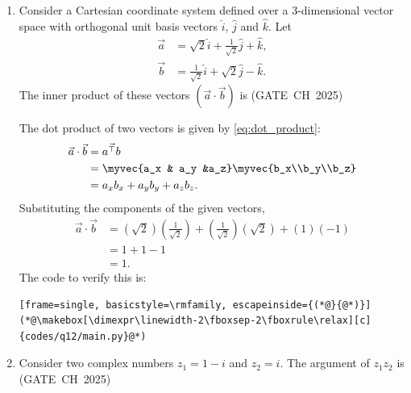 \begin{enumerate}[label=\thesubsection.\arabic*, ref=\thesubsection.\theenumi,itemsep=0pt]

\item Consider a Cartesian coordinate system defined over a 3-dimensional vector space with orthogonal unit basis vectors $\hat{i}$, $\hat{j}$ and $\hat{k}$. Let
\begin{align}
\vec{a} &= \sqrt{2}\hat{i}+\frac{1}{\sqrt{2}}\hat{j}+\hat{k},\\
\vec{b} &= \frac{1}{\sqrt{2}}\hat{i}+\sqrt{2}\hat{j}-\hat{k}.
\end{align}
The inner product of these vectors $(\vec{a}\cdot\vec{b})$ is \hfill (GATE~CH~2025)
\begin{enumerate}[itemsep=0pt]
\end{enumerate}

\solution The dot product of two vectors is given by \eqref{eq:dot_product}:
\begin{align}
\vec{a}\cdot\vec{b} &= \vec{a^{\top}b}\\
&= \myvec{a_x & a_y &a_z}\myvec{b_x\\b_y\\b_z}\\
&= a_xb_x+a_yb_y+a_zb_z.
\end{align}
Substituting the components of the given vectors,
\begin{align}
\vec{a}\cdot\vec{b}
&=\left(\sqrt{2}\right)\left(\frac{1}{\sqrt{2}}\right)
+\left(\frac{1}{\sqrt{2}}\right)\left(\sqrt{2}\right)
+(1)(-1)\\
&=1+1-1\\
&=1.
\end{align}
The code to verify this is:
\begin{lstlisting}[frame=single, basicstyle=\rmfamily, escapeinside={(*@}{@*)}]
(*@\makebox[\dimexpr\linewidth-2\fboxsep-2\fboxrule\relax][c]{codes/q12/main.py}@*)
\end{lstlisting}

\item Consider two complex numbers $z_1=1-i$ and $z_2=i$. The argument of $z_1z_2$ is \hfill (GATE~CH~2025)
\begin{enumerate}[itemsep=0pt]
\end{enumerate}


\end{enumerate}
